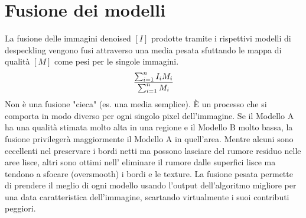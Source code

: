 \section{Fusione dei modelli}
La fusione delle immagini denoised $[I]$ prodotte tramite i rispettivi modelli di despeckling vengono fusi attraverso una media pesata sfuttando
le mappa di qualità $[M]$ come pesi per le singole immagini.
\begin{equation}
    \makebox[\textwidth][c]{%
      $\displaystyle
        \frac{\sum_{i=1}^{n} I_i M_i}{\sum_{i=1}^{n} M_i}
      $%
    }
\end{equation}
Non è una fusione "cieca" (es. una media semplice). È un processo che si 
comporta in modo diverso per ogni singolo pixel dell'immagine. Se il Modello A ha una qualità stimata 
molto alta in una regione e il Modello B molto bassa, la fusione privilegerà maggiormente 
il Modello A in quell'area. Mentre alcuni sono eccellenti nel preservare i bordi netti ma possono lasciare del rumore residuo nelle aree lisce, 
altri sono ottimi nell' eliminare il rumore dalle superfici lisce ma tendono a sfocare (oversmooth) i bordi e le texture.
La fusione pesata permette di prendere il meglio di ogni modello usando l'output dell'algoritmo migliore per una data 
caratteristica dell'immagine, scartando virtualmente i suoi contributi peggiori.


